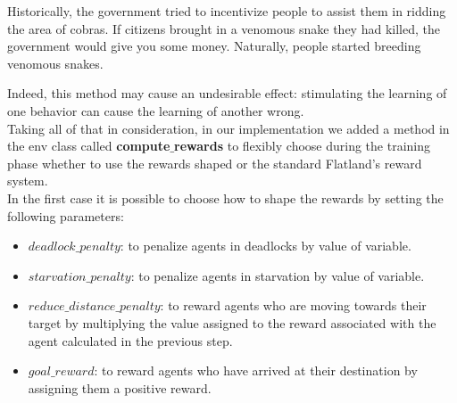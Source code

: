 \begin{quoting}[font=itshape, begintext={"}, endtext={ \footnote{https://medium.com/@BonsaiAI/deep-reinforcement-learning-models-tips-tricks-for-writing-reward-functions-a84fe525e8e0}}]
	Historically, the government tried to incentivize people to assist them in ridding the area of cobras.
	If citizens brought in a venomous snake they had killed, the government would give you some money.
	Naturally, people started breeding venomous snakes.
\end{quoting}

Indeed, this method may cause an undesirable effect: stimulating the learning of one behavior can cause the learning of another wrong.\\
Taking all of that in consideration, in our implementation we added a method in the env class called \textbf{compute$\_$rewards} to flexibly choose during the training phase whether to use the rewards shaped or the standard Flatland's reward system.\\
In the first case it is possible to choose how to shape the rewards by setting the following parameters:
\begin{itemize}
	\item\textbf{$deadlock\_penalty$}: to penalize agents in deadlocks by value of variable.
	\item \textbf{$starvation\_penalty$}: to penalize agents in starvation by value of variable.
	\item \textbf{$reduce\_distance\_penalty$}: to reward agents who are moving towards their target by multiplying the value assigned to the reward associated with the agent calculated in the previous step.
	\item \textbf{$goal\_reward$}: to reward agents who have arrived at their destination by assigning them a positive reward.
\end{itemize}
